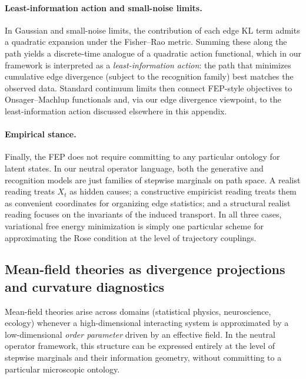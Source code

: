 \documentclass[11pt]{article}
\newcommand{\1}{\mathbf{1}}
\begin{document}
\paragraph{Least-information action and small-noise limits.}
In Gaussian and small-noise limits, the contribution of each edge KL term admits a quadratic expansion under the Fisher--Rao metric. Summing these along the path yields a discrete-time analogue of a quadratic action functional, which in our framework is interpreted as a \emph{least-information action}: the path that minimizes cumulative edge divergence (subject to the recognition family) best matches the observed data. Standard continuum limits then connect FEP-style objectives to Onsager--Machlup functionals and, via our edge divergence viewpoint, to the least-information action discussed elsewhere in this appendix.

\paragraph{Empirical stance.}
Finally, the FEP does not require committing to any particular ontology for latent states. In our neutral operator language, both the generative and recognition models are just families of stepwise marginals on path space. A realist reading treats $X_t$ as hidden causes; a constructive empiricist reading treats them as convenient coordinates for organizing edge statistics; and a structural realist reading focuses on the invariants of the induced transport. In all three cases, variational free energy minimization is simply one particular scheme for approximating the Rose condition at the level of trajectory couplings.


\subsection{Mean-field theories as divergence projections and curvature diagnostics}
\label{app:mean-field}

Mean-field theories arise across domains (statistical physics, neuroscience, ecology) whenever a high-dimensional interacting system is approximated by a low-dimensional \emph{order parameter} driven by an effective field. In the neutral operator framework, this structure can be expressed entirely at the level of stepwise marginals and their information geometry, without committing to a particular microscopic ontology.
\end{document}
